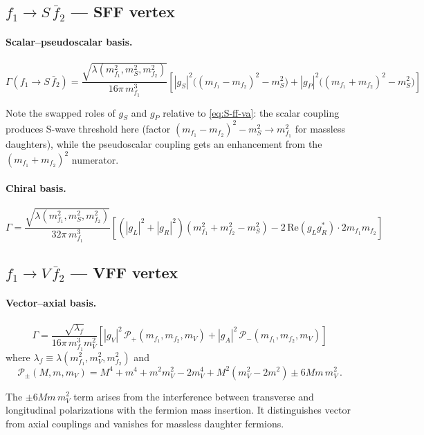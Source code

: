 \documentclass[11pt,a4paper]{article}
\newcommand{\la}{\lambda}
\newcommand{\beq}{\begin{equation}}
\newcommand{\eeq}{\end{equation}}
\newcommand{\conj}[1]{#1^{*}}
\begin{document}
\subsection{$f_1 \to S\,\bar{f}_2$ --- SFF vertex}
\label{sec:f-Sf}

\paragraph{Scalar--pseudoscalar basis.}
\beq
\boxed{
\Gamma(f_1\to S\,\bar{f}_2) = \frac{\sqrt{\la(m_{f_1}^2, m_S^2, m_{f_2}^2)}}{16\pi\, m_{f_1}^3}
\left[|g_S|^2\bigl((m_{f_1}-m_{f_2})^2-m_S^2\bigr)
+ |g_P|^2\bigl((m_{f_1}+m_{f_2})^2-m_S^2\bigr)\right]
}
\label{eq:f-Sf-va}
\eeq

Note the swapped roles of $g_S$ and $g_P$ relative to \eqref{eq:S-ff-va}: the scalar coupling
produces S-wave threshold here (factor $(m_{f_1}-m_{f_2})^2 - m_S^2 \to m_{f_1}^2$ for massless daughters), while
the pseudoscalar coupling gets an enhancement from the $(m_{f_1}+m_{f_2})^2$ numerator.

\paragraph{Chiral basis.}
\beq
\Gamma = \frac{\sqrt{\la(m_{f_1}^2, m_S^2, m_{f_2}^2)}}{32\pi\, m_{f_1}^3}
\left[(|g_L|^2+|g_R|^2)(m_{f_1}^2+m_{f_2}^2-m_S^2)
- 2\,\mathrm{Re}(g_L\conj{g_R})\cdot 2m_{f_1}m_{f_2}\right]
\label{eq:f-Sf-ch}
\eeq


\subsection{$f_1 \to V\,\bar{f}_2$ --- VFF vertex}
\label{sec:f-Vf}

\paragraph{Vector--axial basis.}
\beq
\boxed{
\Gamma = \frac{\sqrt{\la_f}}{16\pi\, m_{f_1}^3 m_V^2}
\left[|g_V|^2\,\mathcal{P}_+(m_{f_1},m_{f_2},m_V)
+ |g_A|^2\,\mathcal{P}_-(m_{f_1},m_{f_2},m_V)\right]
}
\label{eq:f-Vf-va}
\eeq
where $\la_f \equiv \la(m_{f_1}^2, m_V^2, m_{f_2}^2)$ and
\beq
\mathcal{P}_\pm(M,m,m_V) = M^4+m^4+m^2 m_V^2-2m_V^4+M^2(m_V^2-2m^2) \pm 6Mm\,m_V^2\,.
\eeq

The $\pm 6Mm\,m_V^2$ term arises from the interference between transverse and longitudinal polarizations
with the fermion mass insertion. It distinguishes vector from axial couplings and vanishes for
massless daughter fermions.
\end{document}
